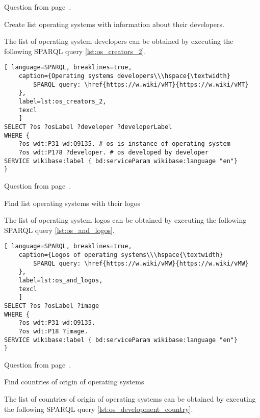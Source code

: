Question from page~\pageref{lst:inception_time_of_operating_systems}.

\begin{exercise}
	\label{answer:os_and_developers}
	Create list operating systems with information about their developers.
\end{exercise}
The list of operating system developers can be obtained by executing the following SPARQL query \ref{lst:os_creators_2}.

\begin{lstlisting}[ language=SPARQL, breaklines=true, 
	caption={Operating systems developers\\\hspace{\textwidth}
		SPARQL query: \href{https://w.wiki/vMT}{https://w.wiki/vMT}
	},
	label=lst:os_creators_2,
	texcl 
	]
SELECT ?os ?osLabel ?developer ?developerLabel
WHERE {
	?os wdt:P31 wd:Q9135. # os is instance of operating system
	?os wdt:P178 ?developer. # os developed by developer
SERVICE wikibase:label { bd:serviceParam wikibase:language "en"}
}
\end{lstlisting}

Question from page~\pageref{tasks:operating_system_tasks}.

\begin{exercise}
	\label{answer:os_and_logos}
	Find list operating systems with their logos
\end{exercise}
The list of operating system logos can be obtained by executing the following SPARQL query \ref{lst:os_and_logos}.

\begin{lstlisting}[ language=SPARQL, breaklines=true, 
	caption={Logos of operating systems\\\hspace{\textwidth}
		SPARQL query: \href{https://w.wiki/vMW}{https://w.wiki/vMW}
	},
	label=lst:os_and_logos,
	texcl 
	]
SELECT ?os ?osLabel ?image 
WHERE {
	?os wdt:P31 wd:Q9135.
	?os wdt:P18 ?image.
SERVICE wikibase:label { bd:serviceParam wikibase:language "en"}
}
\end{lstlisting}

Question from page~\pageref{tasks:operating_system_tasks}.

\begin{exercise}
	\label{answer:os_country}
	Find countries of origin of operating systems
\end{exercise}
The list of countries of origin of operating systems can be obtained by executing the following SPARQL query \ref{lst:os_development_country}.

